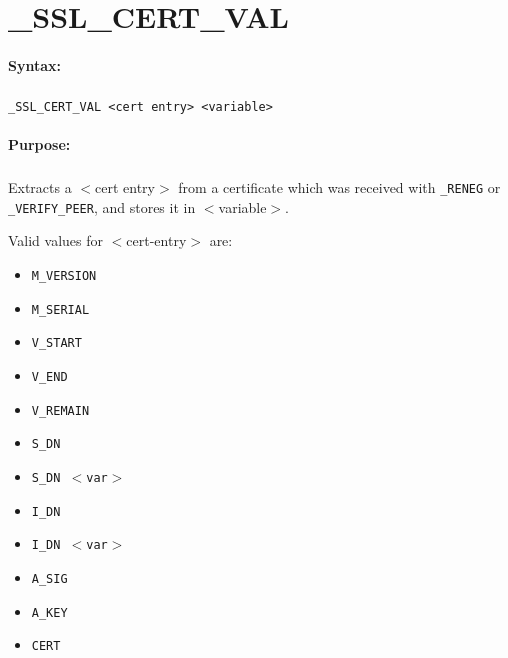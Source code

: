 
\newpage
\section{\_SSL\_CERT\_VAL}
\label{cmd:_SSL_CERT_VAL}

\paragraph{Syntax:}
\subparagraph{}
\texttt{\_SSL\_CERT\_VAL <cert entry> <variable>}

\paragraph{Purpose:}
\subparagraph{}
Extracts a $<$cert entry$>$ from a certificate which was received
with \texttt{\_RENEG} or \texttt{\_VERIFY\_PEER}, and stores it in $<$variable$>$.

Valid values for $<$cert-entry$>$ are:

\begin{itemize}
\item \texttt{M\_VERSION}
\item \texttt{M\_SERIAL}
\item \texttt{V\_START}
\item \texttt{V\_END}
\item \texttt{V\_REMAIN}
\item \texttt{S\_DN}
\item \texttt{S\_DN $<$var$>$}
\item \texttt{I\_DN}
\item \texttt{I\_DN $<$var$>$}
\item \texttt{A\_SIG}
\item \texttt{A\_KEY}
\item \texttt{CERT}
\end{itemize}

